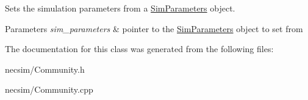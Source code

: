 Sets the simulation parameters from a \hyperlink{struct_sim_parameters}{Sim\+Parameters} object. 


\begin{DoxyParams}{Parameters}
{\em sim\+\_\+parameters} & pointer to the \hyperlink{struct_sim_parameters}{Sim\+Parameters} object to set from \\
\hline
\end{DoxyParams}


The documentation for this class was generated from the following files\+:\begin{DoxyCompactItemize}
\item 
necsim/Community.\+h\item 
necsim/Community.\+cpp\end{DoxyCompactItemize}
